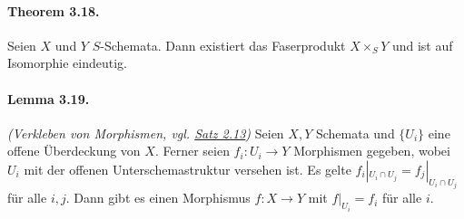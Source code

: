 \documentclass[11pt,b5paper,openany]{memoir}
\begin{document}
\paragraph{Theorem 3.18.}\label{3.18} Seien $X$ und $Y$ $S$-Schemata. Dann existiert das Faserprodukt $X\times_S Y$ und ist auf Isomorphie eindeutig.

\paragraph{Lemma 3.19.}\label{3.19} \textit{(Verkleben von Morphismen, vgl. \hyperref[2.13]{Satz 2.13})} Seien $X,Y$ Schemata und $\{U_i\}$ eine offene Überdeckung von $X$. Ferner seien $f_i:U_i\to Y$ Morphismen gegeben, wobei $U_i$ mit der offenen Unterschemastruktur versehen ist. Es gelte $f_i|_{U_i\cap U_j}=f_j|_{U_i\cap U_j}$ für alle $i,j$. Dann gibt es einen Morphismus $f:X\to Y$ mit $f|_{U_i}=f_i$ für alle $i$.
\end{document}
